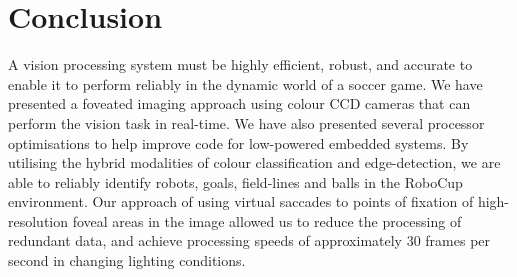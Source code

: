 \documentclass[runningheads,a4paper]{llncs}
\begin{document}

\section{Conclusion}

A vision processing system must be highly efficient, robust, and accurate to
enable it to perform reliably in the dynamic world of a soccer game. We have
presented a foveated imaging approach  using colour CCD cameras that can perform
the vision task in real-time. We have also presented several processor
optimisations to help improve code for low-powered embedded systems. By
utilising the hybrid modalities of colour classification and edge-detection, we
are able to reliably identify robots, goals, field-lines and balls in the
RoboCup environment. Our approach of using virtual saccades to points of
fixation of high-resolution foveal areas in the image allowed us to reduce the
processing of redundant data, and achieve processing speeds of approximately 30
frames per second in changing lighting conditions.



\end{document}
